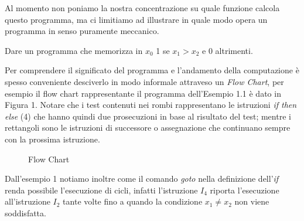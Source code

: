 \begin{nota}		
Al momento non poniamo la nostra concentrazione su quale funzione
calcola questo programma, ma ci limitiamo ad illustrare in quale modo
opera un programma in senso puramente meccanico.
\end{nota}

\begin{extra}
Dare un programma che memorizza in $x_0$ 1 se $x_1 > x_2$ e 0
altrimenti.
\end{extra}	

Per comprendere il significato del programma e l'andamento della
computazione \`e spesso conveniente desciverlo in modo informale
attraveso un \emph{Flow Chart}, per esempio il flow chart
rappresentante il programma dell'Esempio 1.1 \`e dato in Figura
1. Notare che i test contenuti nei rombi rappresentano le istruzioni
\emph{if then else} (4) che hanno quindi due prosecuzioni in base al
risultato del test; mentre i rettangoli sono le istruzioni di
successore o assegnazione che continuano sempre con la prossima
istruzione.
		
\begin{figure}[h] 
\caption{Flow Chart}   
	
\end{figure}
	
Dall'esempio 1 notiamo inoltre come il comando \emph{goto} nella
definizione dell'\emph{if} renda possibile l'esecuzione di cicli,
infatti l'istruzione $I_4$ riporta l'esecuzione all'istruzione $I_2$
tante volte fino a quando la condizione $x_1 \neq x_2$ non viene
soddisfatta.
	
